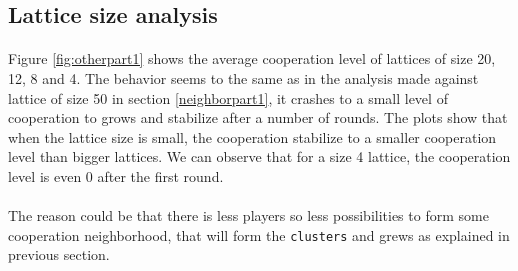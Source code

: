\documentclass[letterpaper]{article}
\begin{document}
\subsection{Lattice size analysis}

\paragraph{}

Figure \ref{fig:otherpart1}  shows the average cooperation level
of lattices of size 20, 12, 8 and 4. The behavior seems to the same
as in the analysis made against lattice of size 50
in section \ref{neighborpart1}, it crashes to a small level of cooperation
to grows and stabilize after a number of rounds. The plots show that when
the lattice size is small, the cooperation stabilize to a smaller cooperation
level than bigger lattices. We can observe that for a size 4 lattice,
the cooperation level is even 0 after the first round.

\paragraph{}

The reason could be that there is less players so less possibilities to
form some cooperation neighborhood, that will form the \texttt{clusters}
and grews as explained in previous section.
\end{document}

